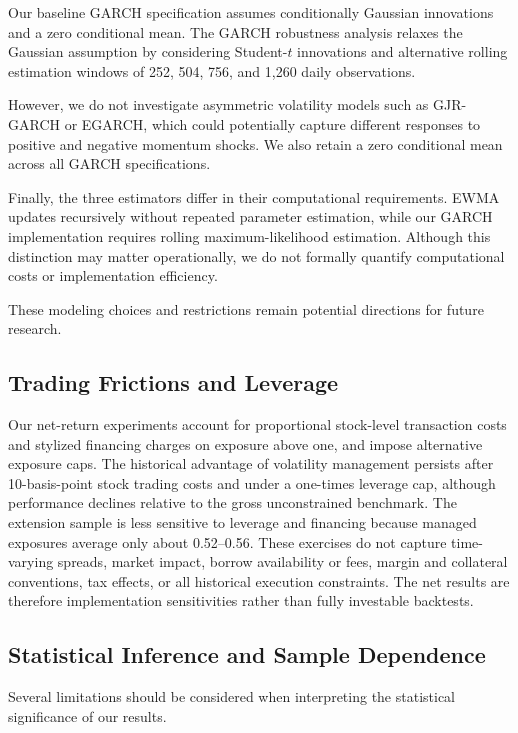 \documentclass[11pt]{article}
\begin{document}
Our baseline GARCH specification assumes
conditionally Gaussian innovations and a
zero conditional mean. The GARCH robustness
analysis relaxes the Gaussian assumption
by considering Student-$t$ innovations
and alternative rolling estimation windows
of 252, 504, 756, and 1,260 daily observations.

However, we do not investigate asymmetric
volatility models such as GJR-GARCH or
EGARCH, which could potentially capture
different responses to positive and negative
momentum shocks. We also retain a zero
conditional mean across all GARCH
specifications.

Finally, the three estimators differ in
their computational requirements. EWMA
updates recursively without repeated
parameter estimation, while our GARCH
implementation requires rolling
maximum-likelihood estimation. Although
this distinction may matter operationally,
we do not formally quantify computational
costs or implementation efficiency.

These modeling choices and restrictions
remain potential directions for
future research.


\subsection{Trading Frictions and Leverage}

Our net-return experiments account for proportional stock-level transaction costs and stylized financing charges on exposure above one, and impose alternative exposure caps. The historical advantage of volatility management persists after 10-basis-point stock trading costs and under a one-times leverage cap, although performance declines relative to the gross unconstrained benchmark. The extension sample is less sensitive to leverage and financing because managed exposures average only about 0.52--0.56. These exercises do not capture time-varying spreads, market impact, borrow availability or fees, margin and collateral conventions, tax effects, or all historical execution constraints. The net results are therefore implementation sensitivities rather than fully investable backtests.



\subsection{Statistical Inference and Sample Dependence}

Several limitations should be considered when
interpreting the statistical significance of
our results.
\end{document}
